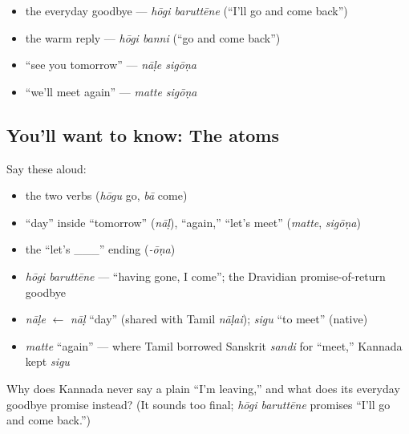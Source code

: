 \begin{itemize}
\raggedright
  \item the everyday goodbye — \emph{hōgi baruttēne} (\textquotedblleft{}I'll go and come back\textquotedblright{})
  \item the warm reply — \emph{hōgi banni} (\textquotedblleft{}go and come back\textquotedblright{})
  \item \textquotedblleft{}see you tomorrow\textquotedblright{} — \emph{nāḷe sigōṇa}
  \item \textquotedblleft{}we'll meet again\textquotedblright{} — \emph{matte sigōṇa}
\end{itemize}

\subsection*{You'll want to know: The atoms}
Say these aloud:

\begin{itemize}
\raggedright
  \item the two verbs (\emph{hōgu} go, \emph{bā} come)
  \item \textquotedblleft{}day\textquotedblright{} inside \textquotedblleft{}tomorrow\textquotedblright{} (\emph{nāḷ}), \textquotedblleft{}again,\textquotedblright{} \textquotedblleft{}let's meet\textquotedblright{} (\emph{matte}, \emph{sigōṇa})
  \item the \textquotedblleft{}let's \_\_\_\textquotedblright{} ending (\emph{-ōṇa})
\end{itemize}

\begin{cousinweb}
\begin{itemize}
\raggedright
  \item \emph{hōgi baruttēne} — \textquotedblleft{}having gone, I come\textquotedblright{}; the Dravidian promise-of-return goodbye
  \item \emph{nāḷe} $\leftarrow$ \emph{nāḷ} \textquotedblleft{}day\textquotedblright{} (shared with Tamil \emph{nāḷai}); \emph{sigu} \textquotedblleft{}to meet\textquotedblright{} (native)
  \item \emph{matte} \textquotedblleft{}again\textquotedblright{} — where Tamil borrowed Sanskrit \emph{sandi} for \textquotedblleft{}meet,\textquotedblright{} Kannada kept \emph{sigu}
\end{itemize}
\end{cousinweb}

\begin{tcolorbox}[breakable,colback=teal!4,colframe=teal!35!black,title={Before you move on}]
Why does Kannada never say a plain \textquotedblleft{}I'm leaving,\textquotedblright{} and what does its everyday goodbye promise instead? (It sounds too final; \emph{hōgi baruttēne} promises \textquotedblleft{}I'll go and come back.\textquotedblright{})
\end{tcolorbox}
